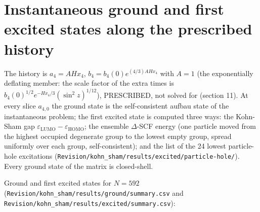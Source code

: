 \documentclass[11pt]{article}
\begin{document}
\section{Instantaneous ground and first excited states along the prescribed history}

The history is $a_4 = AHx_4$, $b_4 = b_4(0)e^{(4/3)AHx_4}$ with $A = 1$ (the exponentially deflating member: the scale factor of the extra times is $b_4(0)^{1/2}e^{-Hx_4/3}(\sin^2 z)^{1/12}$), PRESCRIBED, not solved for (section 11). At every slice $a_{4,0}$ the ground state is the self-consistent aufbau state of the instantaneous problem; the first excited state is computed three ways: the Kohn-Sham gap $\varepsilon_{\mathrm{LUMO}} - \varepsilon_{\mathrm{HOMO}}$; the ensemble $\Delta$-SCF energy (one particle moved from the highest occupied degenerate group to the lowest empty group, spread uniformly over each group, self-consistent); and the list of the 24 lowest particle-hole excitations (\texttt{Revision\allowbreak{}/kohn\_sh\allowbreak{}am/resul\allowbreak{}ts/excit\allowbreak{}ed/parti\allowbreak{}cle-hole\allowbreak{}/}). Every ground state of the matrix is closed-shell.

Ground and first excited states for $N = 592$ (\texttt{Revision\allowbreak{}/kohn\_sh\allowbreak{}am/resul\allowbreak{}ts/groun\allowbreak{}d/summar\allowbreak{}y.csv} and \texttt{Revision\allowbreak{}/kohn\_sh\allowbreak{}am/resul\allowbreak{}ts/excit\allowbreak{}ed/summa\allowbreak{}ry.csv}):
\end{document}
